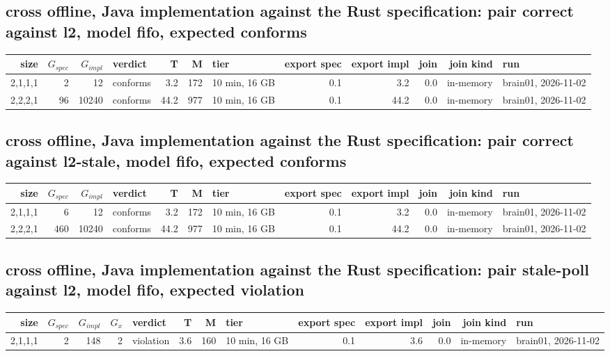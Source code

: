 \documentclass[10pt]{article}
\begin{document}
\subsection*{cross offline, Java implementation against the Rust specification: pair \textsf{correct} against \textsf{l2}, model fifo, expected conforms}
\begin{longtable}{@{}rrrlrrlrrrrl@{}}
\toprule
size & $G_{\mathit{spec}}$ & $G_{\mathit{impl}}$ & verdict & T & M & tier & export spec & export impl & join & join kind & run \\
\midrule
\endhead
\color{red} 2,1,1,1 & 2 & 12 & conforms & 3.2 & 172 & 10 min, 16 GB & 0.1 & 3.2 & 0.0 & in-memory & brain01, 2026-11-02 \\
\color{red} 2,2,2,1 & 96 & 10240 & conforms & 44.2 & 977 & 10 min, 16 GB & 0.1 & 44.2 & 0.0 & in-memory & brain01, 2026-11-02 \\
\bottomrule
\end{longtable}
\subsection*{cross offline, Java implementation against the Rust specification: pair \textsf{correct} against \textsf{l2-stale}, model fifo, expected conforms}
\begin{longtable}{@{}rrrlrrlrrrrl@{}}
\toprule
size & $G_{\mathit{spec}}$ & $G_{\mathit{impl}}$ & verdict & T & M & tier & export spec & export impl & join & join kind & run \\
\midrule
\endhead
\color{red} 2,1,1,1 & 6 & 12 & conforms & 3.2 & 172 & 10 min, 16 GB & 0.1 & 3.2 & 0.0 & in-memory & brain01, 2026-11-02 \\
\color{red} 2,2,2,1 & 460 & 10240 & conforms & 44.2 & 977 & 10 min, 16 GB & 0.1 & 44.2 & 0.0 & in-memory & brain01, 2026-11-02 \\
\bottomrule
\end{longtable}
\subsection*{cross offline, Java implementation against the Rust specification: pair \textsf{stale-poll} against \textsf{l2}, model fifo, expected violation}
\begin{longtable}{@{}rrrrlrrlrrrrl@{}}
\toprule
size & $G_{\mathit{spec}}$ & $G_{\mathit{impl}}$ & $G_x$ & verdict & T & M & tier & export spec & export impl & join & join kind & run \\
\midrule
\endhead
\color{red} 2,1,1,1 & 2 & 148 & 2 & violation & 3.6 & 160 & 10 min, 16 GB & 0.1 & 3.6 & 0.0 & in-memory & brain01, 2026-11-02 \\
\bottomrule
\end{longtable}
\end{document}

